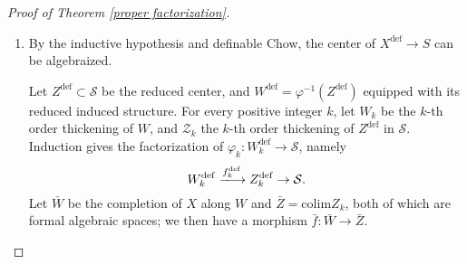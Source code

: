 \documentclass{amsart}
\theoremstyle{definition}
\numberwithin{equation}{section}
\newcommand{\definable}{\mathrm{def}}
\begin{document}
\begin{proof}[Proof of Theorem \ref{proper factorization}]
\begin{enumerate}
		      Obviously $\mathrm{Hilb}(X_{\mathcal{U}})$ is an open subset of $\mathrm{Hilb}(X)$.
		      Let $B$ be the closure of the image of $U$ in $\mathrm{Hilb}(X)$,
		      $V_B \to B$ the restriction of the universal family,
		      $\widetilde{B} \to B$ the normalization,
		      and $V_{\widetilde{B}}\to B$ the base-change of the universal family. We then have solid diagrams
		      \[\begin{tikzcd}[sep = small]
				      &                           & V_{\widetilde{B}} \arrow[ld] \arrow[rd] &                          &  &                         & (V_{\widetilde{B}})^\definable \arrow[ld] \arrow[rd] \arrow[dd] &                                                     \\
				      & V_B \arrow[rd] \arrow[ld] &                                         & \widetilde{B} \arrow[ld] &  & X^\definable \arrow[rd] &                                                                 & \widetilde{B}^\definable \arrow[ld, "\psi", dashed] \\
				      X &                           & B                                       &                          &  &                         & \mathcal{S}                                                     &
			      \end{tikzcd}\]
		      The resulting morphism $\psi$ is a proper modification, as it is proper
		      ($(V_{\widetilde{B}})^\definable$ $\to \mathcal{S}$ is proper and $V_{\widetilde{B}}\to \widetilde{B}$ is surjective)
		      and an isomorphism over $\mathcal{U}$.

		\item
		      By the inductive hypothesis and definable Chow, the center of $X^\definable \to S$ can be algebraized.

		      Let $Z^\definable \subset \mathcal{S}$ be the reduced center, and $W^\definable = \varphi^{-1}(Z^\definable)$
		      equipped with its reduced induced structure.
		      For every positive integer $k$, let $W_k$ be the $k$-th order thickening of $W$,
		      and $\mathcal{Z}_k$ the $k$-th order thickening of $Z^\definable$ in $\mathcal{S}$.
		      Induction gives the factorization of $\varphi_k: W_k^\definable \to \mathcal{S}$, namely
		      \[
			      W_k^\definable  \xlongrightarrow{f_k^\definable} Z_k^\definable \to \mathcal{S}.
		      \]
		      Let $\bar{W}$ be the completion of $X$ along $W$ and $\bar{Z} = \mathrm{colim} Z_k$,
		      both of which are formal algebraic spaces; we then have a morphism $\bar{f}: \bar{W} \to \bar{Z}$.


\end{enumerate}
\end{proof}
\end{document}
